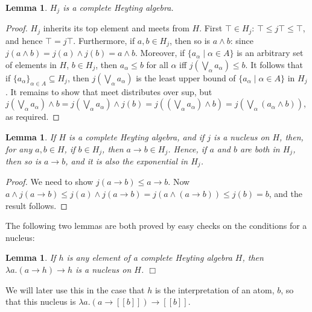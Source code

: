 \documentclass{sn-jnl}
\newcommand{\todo}[1]{\textcolor{red} {[todo: {#1}]}}
\newcommand{\db}[1]{[\![#1]\!]}
\newtheorem{lemma}[theorem]{Lemma}
\newcommand{\fillBox}{\hfill$\Box$}
\begin{document}
\smallskip 

\begin{lemma}
    $H_j$ is a complete Heyting algebra. 
\end{lemma}
\begin{proof}
    $H_j$ inherits its top element and meets from $H$. First $\top\in H_j$: $\top \leq j \top \leq \top$, and hence $\top = j \top$. Furthermore, if $a,b\in H_j$, then so is $a\wedge b$: since
    $j (a\wedge b) = j(a) \wedge j(b) = a \wedge b$. 
    Moreover, if $\{a_\alpha \mid \alpha\in A\}$ is an arbitrary set of elements in $H$, $b\in H_j$, then $a_\alpha \leq b$ for all 
    $\alpha$ iff $j(\bigvee_\alpha a_\alpha) \leq b$. It follows that if $\{a_\alpha \}_{\alpha \in A} \subseteq H_j$, then $j(\bigvee_\alpha a_\alpha)$ is the least upper bound of $\{a_\alpha \mid \alpha\in A\}$ in $H_j$. 
    It remains to show that meet distributes over sup, but
    $j(\bigvee_\alpha a_\alpha) \wedge b = j(\bigvee_\alpha a_\alpha) \wedge j(b) = j((\bigvee_\alpha a_\alpha) \wedge b)
    = j(\bigvee_\alpha (a_\alpha \wedge b))$, as required. 
\end{proof}

\begin{lemma}
    If $H$ is a complete Heyting algebra, and if $j$ is a nucleus on $H$, then,  for any $a, b\in H$, if $b\in H_j$, then $a\to b \in H_j$.  Hence, if $a$ and $b$ are both in $H_j$, then so is $a\to b$, and it is also the exponential in $H_j$. 
\end{lemma}
\begin{proof}
   We need to show $j(a\to b) \leq a\to b$. Now $a\wedge j(a\to b) \leq j(a) \wedge j(a\to b) = j(a\wedge (a\to b)) \leq j (b) = b$, and the result follows.  
\end{proof}

The following two lemmas are both proved by easy checks on the conditions for a nucleus: 

\smallskip

\begin{lemma}
    If $h$ is any element of a complete Heyting algebra $H$, then $\lambda a. (a\to h)\to h$ is a nucleus on $H$. \fillBox
\end{lemma}

We will later use this in the case that $h$ is the interpretation of an atom, $b$, so that this nucleus is $\lambda a. (a\to \db{b})\to \db{b}$.

\end{document}
